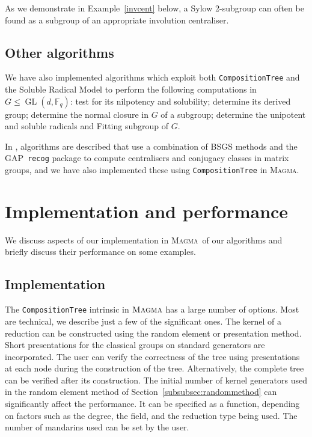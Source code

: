 \documentclass[12pt,twoside,reqno,psamsfonts]{amsproc}
\newcommand{\comment}[1]{\marginpar{\begin{center}\scriptsize{#1}\end{center}}}
\numberwithin{equation}{section}
\numberwithin{figure}{section}
\newcounter{algorithm}
\theoremstyle{plain}
\theoremstyle{definition}
\theoremstyle{remark}
\newcommand{\field}[1]{\mathbb{#1}}
\newcommand{\F}{\field{F}}
\newcommand{\GAP}{\textsf{GAP}}
\newcommand{\MAGMA}{\textsc{Magma}}
\DeclareMathOperator{\GL}{GL}
\begin{document}
As we demonstrate in Example~\ref{invcent} below, 
a Sylow 2-subgroup can often be found as a subgroup of an appropriate
involution centraliser.

\subsection{Other algorithms} 
We have also implemented algorithms which exploit 
both {\tt CompositionTree} and the 
Soluble Radical Model to perform the following computations 
in $G \leqslant \GL(d, \F_q)$:  test for its nilpotency and solubility; 
determine its derived group; determine 
the normal closure in $G$ of a subgroup; 
determine the unipotent and soluble radicals and Fitting subgroup of $G$. 

In \cite{MR3056697}, algorithms are described that use a combination of
\comment{DFH: added paragraph}
BSGS methods and the \GAP\ {\tt recog} package to compute
centralisers and conjugacy classes in matrix groups, and we have
also implemented these using {\tt CompositionTree} in \MAGMA. 

\section{Implementation and performance}
\label{implementation}
We discuss aspects of our implementation
in \MAGMA\ of our algorithms and briefly discuss 
their performance on some examples.

\subsection{Implementation}

The {\tt CompositionTree} intrinsic in $\MAGMA$ has a large 
number of options. Most are technical, 
we describe just a few of the significant ones.
The kernel of a reduction 
can be constructed using the random element or presentation method. 
Short presentations for the classical groups
on standard generators are incorporated.
The user can verify the correctness of the tree using presentations
at each node during the construction of the tree. Alternatively,
the complete tree can be verified after its construction.
The initial number of kernel generators used in the random element method
of Section~\ref{subsubsec:randommethod} can significantly
affect the performance. It can be specified as a function,
depending on factors such as the degree, the field, and
the reduction type being used. The number of mandarins used can be
set by the user. 
\end{document}
